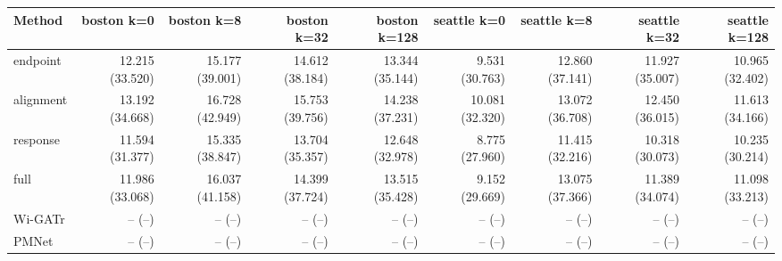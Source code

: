 \begin{tabular}{lrrrrrrrr}
\toprule
Method & boston k=0 & boston k=8 & boston k=32 & boston k=128 & seattle k=0 & seattle k=8 & seattle k=32 & seattle k=128 \\
\midrule
endpoint & 12.215 (33.520) & 15.177 (39.001) & 14.612 (38.184) & 13.344 (35.144) & 9.531 (30.763) & 12.860 (37.141) & 11.927 (35.007) & 10.965 (32.402) \\
alignment & 13.192 (34.668) & 16.728 (42.949) & 15.753 (39.756) & 14.238 (37.231) & 10.081 (32.320) & 13.072 (36.708) & 12.450 (36.015) & 11.613 (34.166) \\
response & 11.594 (31.377) & 15.335 (38.847) & 13.704 (35.357) & 12.648 (32.978) & 8.775 (27.960) & 11.415 (32.216) & 10.318 (30.073) & 10.235 (30.214) \\
full & 11.986 (33.068) & 16.037 (41.158) & 14.399 (37.724) & 13.515 (35.428) & 9.152 (29.669) & 13.075 (37.366) & 11.389 (34.074) & 11.098 (33.213) \\
Wi-GATr & -- (--) & -- (--) & -- (--) & -- (--) & -- (--) & -- (--) & -- (--) & -- (--) \\
PMNet & -- (--) & -- (--) & -- (--) & -- (--) & -- (--) & -- (--) & -- (--) & -- (--) \\
\bottomrule
\end{tabular}
